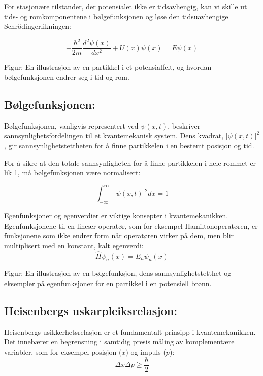 For stasjonære tilstander, der potensialet ikke er tidsavhengig, kan vi skille ut tids- og romkomponentene i bølgefunksjonen og løse den tidsuavhengige Schrödingerlikningen:

\begin{equation*}
-\frac{\hbar^2}{2m}\frac{d^2\psi(x)}{dx^2} + U(x)\psi(x) = E\psi(x)
\end{equation*}

Figur: En illustrasjon av en partikkel i et potensialfelt, og hvordan bølgefunksjonen endrer seg i tid og rom.


\subsection*{Bølgefunksjonen:}

Bølgefunksjonen, vanligvis representert ved $\psi(x,t)$, beskriver sannsynlighetsfordelingen til et kvantemekanisk system. Dens kvadrat, $|\psi(x,t)|^2$, gir sannsynlighetstettheten for å finne partikkelen i en bestemt posisjon og tid.

For å sikre at den totale sannsynligheten for å finne partikkelen i hele rommet er lik 1, må bølgefunksjonen være normalisert:

\begin{equation*}
\int_{-\infty}^{\infty} |\psi(x,t)|^2 dx = 1
\end{equation*}

Egenfunksjoner og egenverdier er viktige konsepter i kvantemekanikken. Egenfunksjonene til en lineær operatør, som for eksempel Hamiltonoperatøren, er funksjonene som ikke endrer form når operatøren virker på dem, men blir multiplisert med en konstant, kalt egenverdi:
\begin{equation*}
\hat{H}\psi_n(x) = E_n\psi_n(x)
\end{equation*}

Figur: En illustrasjon av en bølgefunksjon, dens sannsynlighetstetthet og eksempler på egenfunksjoner for en partikkel i en potensiell brønn.
\subsection*{Heisenbergs uskarpleiksrelasjon:}

Heisenbergs usikkerhetsrelasjon er et fundamentalt prinsipp i kvantemekanikken. Det innebærer en begrensning i samtidig presis måling av komplementære variabler, som for eksempel posisjon ($x$) og impuls ($p$):
\begin{equation*}
\Delta x \Delta p \geq \frac{\hbar}{2}
\end{equation*}

